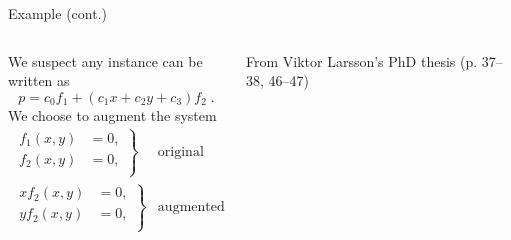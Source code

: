 \documentclass[aspectratio=169]{beamer}
\begin{document}
\begin{frame}[t]{Example (cont.)}
\vspace{1cm}
\begin{columns}
    \begin{column}{0.7\textwidth}
        We suspect any instance can be written as
        \begin{equation*}
            p = c_0f_1 + (c_1x+c_2y+c_3)f_2\;.
        \end{equation*}
        We choose to augment the system
        \begin{equation*}%
            \begin{aligned}
            \left.
            \begin{aligned}
            f_1(x,y) & = 0, \\
            f_2(x,y) & = 0, \\
            \end{aligned}
            \right\}&\text{original}
            \\
            \left.
            \begin{aligned}
            xf_2(x,y) & = 0, \\
            yf_2(x,y) & = 0, \\
            \end{aligned}
            \right\}&\text{augmented}
            \end{aligned}
        \end{equation*}
    \end{column}%
    \begin{column}{0.3\textwidth}
        \centering
        

        \vspace{5mm}

        {\scriptsize From Viktor Larsson's PhD thesis (p. 37--38, 46--47)}
    \end{column}
\end{columns}
\end{frame}
\end{document}
